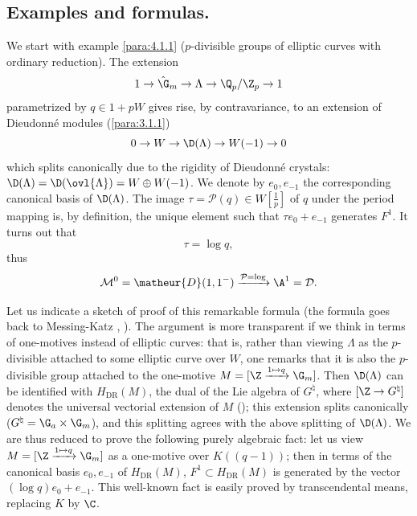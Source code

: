 \subsection{Examples and formulas.}\label{sub:6.3} 

\begin{para}\label{para:6.3.1} We start with example \ref{para:4.1.1}
 ($p$-divisible groups of elliptic curves with ordinary reduction).
 The extension
 \begin{equation*}
  1\rightarrow {\hat\G_m}\rightarrow \Lambda\rightarrow \Q_p/\Z_p\rightarrow 1
 \end{equation*}
 parametrized by $q\in 1+pW$ gives rise, by contravariance, to an
 extension of Dieudonn\'e modules (\cf \ref{para:3.1.1}) 
 \begin{equation*}
  0\rightarrow W\rightarrow \D(\Lambda)\rightarrow W(-1)\rightarrow 0
 \end{equation*}
 which splits canonically due to the rigidity of Dieudonn\'e crystals:
 $\D(\Lambda)=\D(\ovl{\Lambda})=W\oplus W(-1)$.  We denote by
 $e_0,e_{-1}$ the corresponding canonical basis of $\D(\Lambda)$. The
 image $\tau=\mathcal{P}(q)\in W[\frac{1}{p}]$ of $q$ under the period
 mapping is, by definition, the unique element such that $\tau
 e_0+e_{-1}$ generates $F^1$. It turns out that
 \begin{equation*}
  \tau=\log q,
 \end{equation*} 
 thus
 \begin{equation*}
  \mathcal{M}^0=\matheur{D}(1,1^-)
  \xrightarrow{\mathcal{P}=\log} \A^1 =\mathcal{D}.
 \end{equation*}

 Let us indicate a sketch of proof of this remarkable formula (the
 formula goes back to Messing-Katz \cite{q}, \cite{slm}).  The argument
 is more transparent if 
 we think in terms of one-motives instead of elliptic curves: that is,
 rather than viewing $\Lambda$ as the $p$-divisible attached to some
 elliptic curve over $W$, one remarks that it is also the $p$-divisible
 group attached to the one-motive $M=[\Z
 \xrightarrow{1\mapsto q} \G_m]$. Then $\D(\Lambda)$ can be identified
 with $H_{\mathrm{DR}}(M)$, the dual of the Lie algebra of $G^\natural$, where
 $[\Z \rightarrow G^\natural]$ denotes the universal vectorial extension
 of $M$ (\cf \cite{tdh3}); this extension splits canonically
 ($G^\natural=\G_a\times \G_m$), and this splitting agrees with the
 above splitting of $\D(\Lambda)$. We are thus reduced to prove the
 following purely algebraic fact: let us view $M=[\Z
 \xrightarrow{1\mapsto q} \G_m]$ as a
 one-motive over $K((q-1))$; then in terms of the canonical basis
 $e_0,e_{-1}$ of $H_{\mathrm{DR}}(M)$, $F^1\subset
 H_{\mathrm{DR}}(M)$ is generated by the 
 vector $(\log q)e_0+e_{-1}$. This well-known fact is easily proved by
 transcendental means, replacing $K$ by $\C$.
\end{para}

